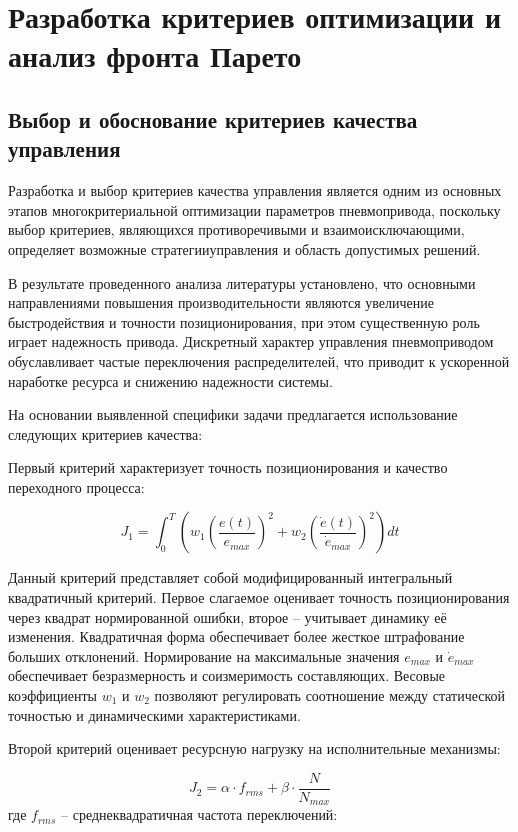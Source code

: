 \section{Разработка критериев оптимизации и анализ фронта Парето}\label{sec:ch4/sec6}
\subsection{Выбор и обоснование критериев качества управления}\label{sec:ch4/sec6/subsec1}

Разработка и выбор критериев качества управления является одним из основных этапов многокритериальной
оптимизации параметров пневмопривода, поскольку выбор критериев, являющихся противоречивыми
и взаимоисключающими, определяет возможные стратегииуправления и область допустимых решений.

В результате проведенного анализа литературы установлено, что основными направлениями
повышения производительности являются увеличение быстродействия и точности
позиционирования, при этом существенную роль играет надежность
привода. Дискретный характер управления пневмоприводом обуславливает частые
переключения распределителей, что приводит к ускоренной наработке ресурса и снижению надежности системы.

На основании выявленной специфики задачи предлагается использование следующих критериев качества:

Первый критерий характеризует точность позиционирования и качество переходного процесса:

\begin{equation}
	J_1 = \int_0^T \left(w_1\left(\frac{e(t)}{e_{max}}\right)^2 + w_2\left(\frac{\dot{e}(t)}{\dot{e}_{max}}\right)^2\right)dt
\end{equation}

Данный критерий представляет собой модифицированный интегральный квадратичный критерий.
Первое слагаемое оценивает точность позиционирования через квадрат нормированной ошибки,
второе -- учитывает динамику её изменения. Квадратичная форма обеспечивает
более жесткое штрафование больших отклонений. Нормирование на
максимальные значения $e_{max}$ и $\dot{e}_{max}$ обеспечивает
безразмерность и соизмеримость составляющих. Весовые коэффициенты
$w_1$ и $w_2$ позволяют регулировать соотношение между статической точностью и динамическими характеристиками.

Второй критерий оценивает ресурсную нагрузку на исполнительные механизмы:

\begin{equation}
	J_2 = \alpha \cdot f_{rms} + \beta \cdot \frac{N}{N_{max}}
\end{equation}
где $f_{rms}$ -- среднеквадратичная частота переключений:

